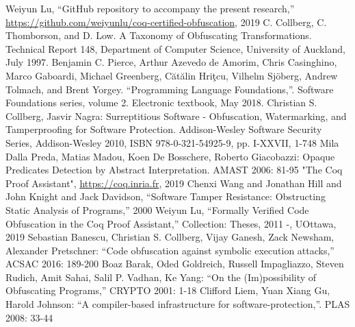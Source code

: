 \documentclass[compsoc,conference,a4paper,10pt,times]{IEEEtran}
\begin{document}
\begin{thebibliography}{00}
 Weiyun Lu, ``GitHub repository to accompany the present research,'' \url{https://github.com/weiyunlu/coq-certified-obfuscation}, 2019 
 C. Collberg, C. Thomborson, and D. Low.
A Taxonomy of Obfuscating Transformations.
Technical Report 148, Department of Computer Science, University of Auckland, July 1997.
 Benjamin C. Pierce, Arthur Azevedo de Amorim, Chris Casinghino, Marco Gaboardi, Michael Greenberg, C\u{a}t\u{a}lin Hri\c{t}cu, Vilhelm Sj\"oberg, Andrew 
Tolmach, and Brent Yorgey. ``Programming Language Foundations,''. Software Foundations series, volume 2. Electronic textbook, May 2018.
 	Christian S. Collberg, Jasvir Nagra:
Surreptitious Software - Obfuscation, Watermarking, and Tamperproofing for Software Protection. Addison-Wesley Software Security Series, Addison-Wesley 2010, ISBN 978-0-321-54925-9, pp. I-XXVII, 1-748
 Mila Dalla Preda, Matias Madou, Koen De Bosschere, Roberto Giacobazzi:
Opaque Predicates Detection by Abstract Interpretation. AMAST 2006: 81-95
 "The {Coq Proof Assistant}", \url{https://coq.inria.fr}, 2019
 Chenxi Wang and Jonathan Hill and John Knight and Jack Davidson, ``Software Tamper Resistance: Obstructing Static Analysis of Programs,'' 2000
 Weiyun Lu, ``Formally Verified Code Obfuscation in the Coq Proof Assistant,'' Collection: Theses, 2011 -, UOttawa, 2019 
 	Sebastian Banescu, Christian S. Collberg, Vijay Ganesh, Zack Newsham, Alexander Pretschner:
``Code obfuscation against symbolic execution attacks,'' ACSAC 2016: 189-200
 Boaz Barak, Oded Goldreich, Russell Impagliazzo, Steven Rudich, Amit Sahai, Salil P. Vadhan, Ke Yang:
``On the (Im)possibility of Obfuscating Programs,'' CRYPTO 2001: 1-18
 	Clifford Liem, Yuan Xiang Gu, Harold Johnson:
``A compiler-based infrastructure for software-protection,''. PLAS 2008: 33-44
\end{thebibliography}
\end{document}
